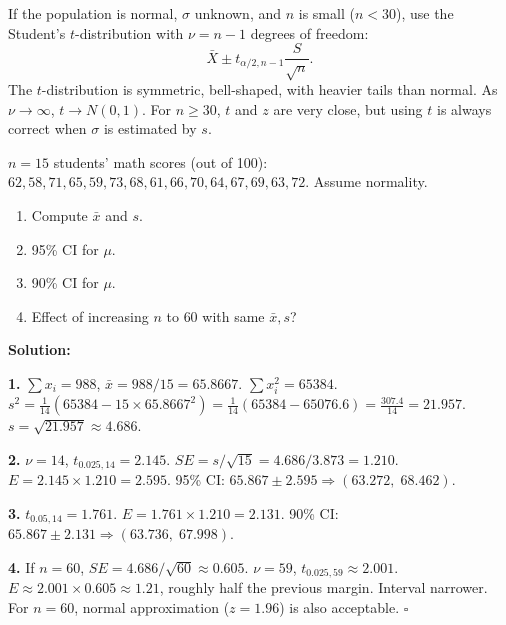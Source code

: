\documentclass[11pt]{article}
\providecommand{\qed}{\hfill$\square$}
\newcommand{\cle}[1]{{\popxbold\color{popdark}#1}}
\begin{document}
\begin{propriete}
If the population is normal, $\sigma$ unknown, and $n$ is small ($n<30$), use the \cle{Student's $t$-distribution} with $\nu = n-1$ degrees of freedom:
\[
\bar{X} \pm t_{\alpha/2, n-1} \frac{S}{\sqrt{n}}.
\]
The $t$-distribution is symmetric, bell-shaped, with heavier tails than normal. As $\nu \to \infty$, $t \to N(0,1)$. For $n \ge 30$, $t$ and $z$ are very close, but using $t$ is always correct when $\sigma$ is estimated by $s$.
\end{propriete}

\begin{exoresolu}
$n=15$ students' math scores (out of 100):
$62, 58, 71, 65, 59, 73, 68, 61, 66, 70, 64, 67, 69, 63, 72$.
Assume normality.
\begin{enumerate}
\item Compute $\bar{x}$ and $s$.
\item 95\% CI for $\mu$.
\item 90\% CI for $\mu$.
\item Effect of increasing $n$ to $60$ with same $\bar{x}, s$?
\end{enumerate}
\tcblower
\textbf{Solution:}

\textbf{1.} $\sum x_i = 988$, $\bar{x} = 988/15 = 65.8667$.
$\sum x_i^2 = 65384$.
$s^2 = \frac{1}{14}(65384 - 15\times65.8667^2) = \frac{1}{14}(65384 - 65076.6) = \frac{307.4}{14} = 21.957$.
$s = \sqrt{21.957} \approx 4.686$.

\textbf{2.} $\nu=14$, $t_{0.025,14}=2.145$.
$SE = s/\sqrt{15} = 4.686/3.873 = 1.210$.
$E = 2.145 \times 1.210 = 2.595$.
95\% CI: $65.867 \pm 2.595 \Rightarrow (63.272,\; 68.462)$.

\textbf{3.} $t_{0.05,14}=1.761$.
$E = 1.761 \times 1.210 = 2.131$.
90\% CI: $65.867 \pm 2.131 \Rightarrow (63.736,\; 67.998)$.

\textbf{4.} If $n=60$, $SE = 4.686/\sqrt{60} \approx 0.605$. $\nu=59$, $t_{0.025,59} \approx 2.001$.
$E \approx 2.001 \times 0.605 \approx 1.21$, roughly half the previous margin. Interval narrower. For $n=60$, normal approximation ($z=1.96$) is also acceptable. \qed
\end{exoresolu}
\end{document}
